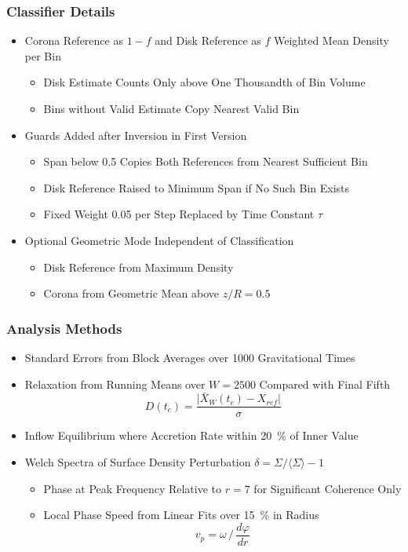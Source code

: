 	\begin{frame}
		\frametitle{Classifier Details}
		\begin{itemize}
			\item Corona Reference as $1 - f$ and Disk Reference as $f$ Weighted Mean Density per Bin
			\begin{itemize}
				\item Disk Estimate Counts Only above One Thousandth of Bin Volume
				\item Bins without Valid Estimate Copy Nearest Valid Bin
			\end{itemize}
			\item Guards Added after Inversion in First Version
			\begin{itemize}
				\item Span below \qty{0.5}{\dex} Copies Both References from Nearest Sufficient Bin
				\item Disk Reference Raised to Minimum Span if No Such Bin Exists
				\item Fixed Weight \num{0.05} per Step Replaced by Time Constant $\tau$
			\end{itemize}
			\item Optional Geometric Mode Independent of Classification
			\begin{itemize}
				\item Disk Reference from Maximum Density
				\item Corona from Geometric Mean above $z / R = 0.5$
			\end{itemize}
		\end{itemize}
	\end{frame}

	\begin{frame}
		\frametitle{Analysis Methods}
		\begin{itemize}
			\item Standard Errors from Block Averages over \num{1000} Gravitational Times
			\item Relaxation from Running Means over $W = 2500$ Compared with Final Fifth
				  $$D(t_c) = \frac{\lvert \bar X_W(t_c) - X_{ref} \rvert}{\sigma}$$
			\item Inflow Equilibrium where Accretion Rate within \qty{20}{\percent} of Inner Value
			\item Welch Spectra of Surface Density Perturbation $\delta = \Sigma / \langle \Sigma \rangle - 1$
			\begin{itemize}
				\item Phase at Peak Frequency Relative to $r = 7$ for Significant Coherence Only
				\item Local Phase Speed from Linear Fits over \qty{15}{\percent} in Radius
					  $$v_p = \omega \, / \, \frac{d\varphi}{dr}$$
			\end{itemize}
		\end{itemize}
	\end{frame}

